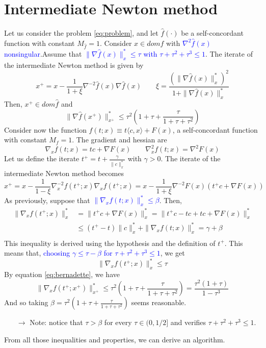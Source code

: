 \documentclass[12pt, openany]{report}
\theoremstyle{definition}
\begin{document}
\section{Intermediate Newton method}
Let us consider the problem \eqref{eq:problem}, and let $\hat f(\cdot)$ be a self-concordant function with constant $M_{\hat f} = 1$. Consider $x\in dom\hat f$ with \textcolor{blue}{$\nabla^2\hat f(x)$ nonsingular}.Assume that \textcolor{blue}{$\|\nabla \hat f(x)\|_x^* \le \tau$ with $\tau+\tau^2 +\tau^3\le 1$}. The iterate of the intermediate Newton method is given by 
\begin{equation}
	x^+ = x - \frac{1}{1+\xi} \nabla^{-2}\hat f(x)\nabla \hat f(x) \qquad \xi = \frac{(\|\nabla \hat f(x)\|_x^*)^2}{1+\|\nabla \hat f(x)\|_x^*}
\end{equation}
Then, $x^+\in dom\hat f$ and 
\begin{equation}\label{eq:bernadette}
	\|\nabla \hat f(x^+)\|_{x^+}^* \le \tau^2\left(1+\tau+\frac{\tau}{1+\tau+\tau^2}\right)
\end{equation}
Consider now the function $f(t;x) \equiv t\langle c,x\rangle + F(x)$, a self-concordant function with constant $M_f=1$. The gradient and hessian are 
\begin{equation}
	\nabla_x f(t;x) = tc + \nabla F(x) \qquad \nabla^2_x f(t;x) = \nabla^2F(x)
\end{equation}
Let us define the iterate $t^+ = t + \frac{\gamma}{\|c\|_x^*}$ with $\gamma>0$. The iterate of the intermediate Newton method becomes
\begin{equation}
	x^+ = x - \frac{1}{1-\xi}\nabla^{-2}_xf(t^+;x)\nabla_xf(t^+; x) = x-\frac{1}{1+\xi}\nabla^{-2}F(x)(t^+ c + \nabla F(x))
\end{equation}
As previously, suppose that \textcolor{blue}{$\|\nabla_x f(t;x)\|_x^* \le \beta$}. Then, 
\begin{equation}
	\begin{aligned}
		\|\nabla_xf(t^+;x)\|_x^* & = \|t^+c + \nabla F(x)\|_x^* = \|t^+c-tc+tc + \nabla F(x)\|_x^*\\
		& \le (t^+-t)\|c\|_x^* + \|\nabla_xf(t;x)\|_x^* = \gamma +\beta\\
	\end{aligned}
\end{equation}
This inequality is derived using the hypothesis and the definition of $t^+$. This means that, \textcolor{blue}{choosing $\gamma \le \tau - \beta$ for $\tau+\tau^2+\tau^3\le 1$}, we get 
\begin{equation}
	\| \nabla_x f(t^+;x)\|_x^* \le \tau
\end{equation}
By equation \eqref{eq:bernadette}, we have
\begin{equation}
	\|\nabla_x f(t^+; x^+)\|_{x^+}^* \le \tau^2\left(1+\tau+\frac{\tau}{1+\tau+\tau^2}\right) = \frac{\tau^2(1+\tau)}{1-\tau^3}
\end{equation}
And so taking $\beta = \tau^2 \left(1+\tau+\frac{\tau}{1+\tau+\tau^2}\right)$ seems reasonable. 
\begin{itemize}
	\item [$\to$] Note: notice that $\tau>\beta$ for every $\tau\in (0,1/2]$ and verifies $\tau+\tau^2+\tau^3\le 1$.
\end{itemize}
From all those inequalities and properties, we can derive an algorithm. 
\end{document}
